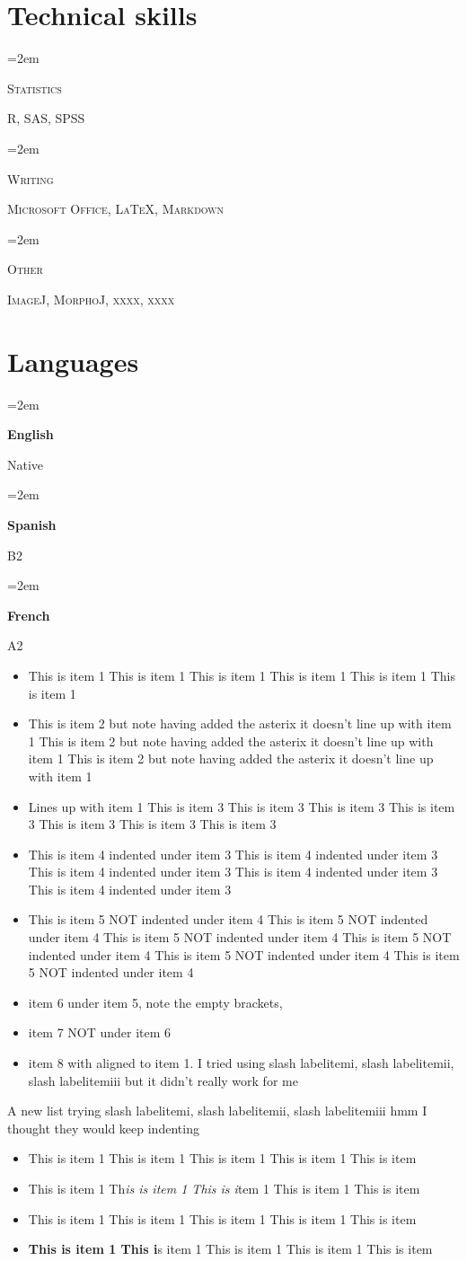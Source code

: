 \documentclass[a4paper,11pt,english]{article}
\newlength{\spacebox}
\newcommand{\skill}[2]{
	\noindent\hangindent=2em\hangafter=0
	\parbox{3\spacebox}{%
		\textsc{#1}} %
	#2 \par} %
\newcommand{\lan}[2]{
	\noindent\hangindent=2em\hangafter=0
	\parbox{\spacebox}{%
		\textbf{#1}} %
	#2 \par}    %
\begin{document}
\section*{Technical skills}
\skill{Statistics}{\textsc{R, SAS, SPSS}}
\skill{Writing}{\textsc{Microsoft Office, \LaTeX, 
		\textsc {Markdown}}}
\skill{Other}{\textsc{ImageJ, MorphoJ, xxxx, xxxx}}
\section*{Languages}
\lan{English}{Native}
\lan{Spanish}{B2}
\lan{French}{A2}



\begin{itemize}
	\item This is item 1 This is item 1 This is item 1 This is item 1 This is item 1 This is item 1
	\item[]\textasteriskcentered This is item 2 but note having added the asterix it doesn't line up with item 1 This is item 2 but note having added the asterix it doesn't line up with item 1 This is item 2 but note having added the asterix it doesn't line up with item 1
	\item Lines up with item 1 This is item 3 This is item 3 This is item 3 This is item 3 This is item 3 This is item 3 This is item 3
	\item[]\textasteriskcentered This is item 4 indented under item 3  This is item 4 indented under item 3  This is item 4 indented under item 3  This is item 4 indented under item 3  This is item 4 indented under item 3
	\item[] This is item 5 NOT indented under item 4 This is item 5 NOT indented under item 4 This is item 5 NOT indented under item 4 This is item 5 NOT indented under item 4 This is item 5 NOT indented under item 4 This is item 5 NOT indented under item 4
	\item[]\textperiodcentered item 6 under item 5, note the empty brackets,
	\item[]\textperiodcentered item 7 NOT under item 6 
	
	\item item 8 with aligned to item 1. 
	I tried using slash labelitemi, slash labelitemii, slash labelitemiii but it didn't really work for me
\end{itemize}

A new list trying slash labelitemi, slash labelitemii, slash labelitemiii hmm I thought they would keep indenting
\begin{itemize}
	\item This is item 1 This is item 1 This is item 1 This is item 1 This is item 
	\item[] This is item 1 Th\textit{is is item 1 This is i}tem 1 This is item 1 This is item 
	\item[] This is item 1 This is item 1 This is item 1 This is item 1 This is item 
	\item \textbf{This is item 1 This i}s item 1 This is item 1 This is item 1 This is item 
\end{itemize}
\end{document}
